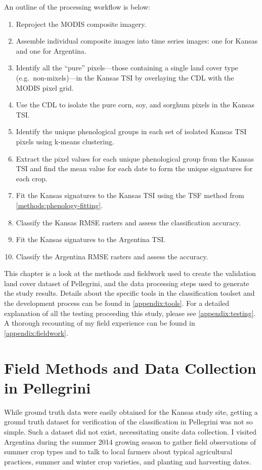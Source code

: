 An outline of the processing workflow is below:

\begin{Spacing}{1.2}
\begin{enumerate}
  \item Reproject the MODIS composite imagery.
  \item Assemble individual composite images into time series images: one for Kansas and one for Argentina.
  \item Identify all the ``pure'' pixels---those containing a single land cover type (e.g.\ non-mixels)---in the Kansas TSI by overlaying the CDL with the MODIS pixel grid.
  \item Use the CDL to isolate the pure corn, soy, and sorghum pixels in the Kansas TSI.
  \item Identify the unique phenological groups in each set of isolated Kansas TSI pixels using k-means clustering.
  \item Extract the pixel values for each unique phenological group from the Kansas TSI and find the mean value for each date to form the unique signatures for each crop.
  \item Fit the Kansas signatures to the Kansas TSI using the TSF method from \autoref{methods:phenology-fitting}.
  \item Classify the Kansas RMSE rasters and assess the classification accuracy.
  \item Fit the Kansas signatures to the Argentina TSI.
  \item Classify the Argentina RMSE rasters and assess the accuracy.
\end{enumerate}
\end{Spacing}

This chapter is a look at the methods and fieldwork used to create the validation land cover dataset of Pellegrini, and the data processing steps used to generate the study results. Details about the specific tools in the classification toolset and the development process can be found in \autoref{appendix:tools}. For a detailed explanation of all the testing proceeding this study, please see \autoref{appendix:testing}. A thorough recounting of my field experience can be found in \autoref{appendix:fieldwork}.


\section{Field Methods and Data Collection in Pellegrini}

While ground truth data were easily obtained for the Kansas study site, getting a ground truth dataset for verification of the classification in Pellegrini was not so simple. Such a dataset did not exist, necessitating onsite data collection. I visited Argentina during the summer 2014 growing season to gather field observations of summer crop types and to talk to local farmers about typical agricultural practices, summer and winter crop varieties, and planting and harvesting dates.


